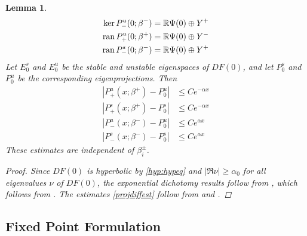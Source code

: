 \documentclass[10pt,reqno]{amsart}
\theoremstyle{plain}
\newtheorem{lemma}[theorem]{Lemma}
\theoremstyle{definition}
\theoremstyle{remark}
\numberwithin{theorem}{section}
\numberwithin{equation}{section}
\begin{document}
\begin{lemma}
\begin{align*}
\mathop\mathrm{ker}\nolimits P^u_-(0; \beta^-) &= \mathbb{R} \Psi(0) \oplus Y^+ \\
\operatorname{ran} P^u_+(0; \beta^+) &= \mathbb{R} \Psi(0) \oplus Y^- \\
\operatorname{ran} P^s_-(0; \beta^-) &= \mathbb{R} \Psi(0) \oplus Y^+
\end{align*}
Let $E_0^s$ and $E_0^u$ be the stable and unstable eigenspaces of $DF(0)$, and let $P_0^s$ and $P_0^u$ be the corresponding eigenprojections. Then
\begin{equation}\label{projdiffest}
\begin{aligned}
|P^u_+(x; \beta^+) - P_0^u| &\leq C e^{-\alpha x} \\
|P^s_+(x; \beta^+) - P_0^s| &\leq C e^{-\alpha x} \\
|P^u_-(x; \beta^-) - P_0^u| &\leq C e^{\alpha x} \\
|P^s_-(x; \beta^-) - P_0^s| &\leq C e^{\alpha x} 
\end{aligned}
\end{equation}
These estimates are independent of $\beta_i^\pm$.

\begin{proof}
Since $DF(0)$ is hyperbolic by \cref{hyp:hypeq} and $|\Re \nu| \geq \alpha_0$ for all eigenvalues $\nu$ of $DF(0)$, the exponential dichotomy results follow from \cite[Lemma 5.1]{Sandstede1997}, which follows from \cite[Lemma 1.1]{Sandstede1993}. The estimates \cref{projdiffest} follow from \cite[Lemma 1.1]{Sandstede1993} and \cite[Lemma 2.1]{Sandstede1993}.
\end{proof}
\end{lemma}

\subsection{Fixed Point Formulation}
\end{document}
